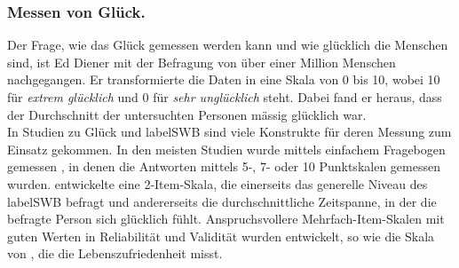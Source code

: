 \subsubsection{Messen von Glück.}
Der Frage, wie das Glück gemessen werden kann und wie glücklich die Menschen sind, ist Ed Diener \citeyear{Myers:1995} mit der Befragung von über einer Million Menschen nachgegangen. Er transformierte die Daten in eine Skala von 0 bis 10, wobei 10 für \textit{extrem glücklich} und 0 für \textit{sehr unglücklich} steht. Dabei fand er heraus, dass der Durchschnitt der untersuchten Personen mässig glücklich war.\\
In Studien zu Glück und \gls{labelSWB} sind viele Konstrukte für deren Messung zum Einsatz gekommen. In den meisten Studien wurde mittels einfachem Fragebogen gemessen \cite{Carr2011}, in denen die Antworten mittels 5-, 7- oder 10 Punktskalen gemessen wurden.  entwickelte eine 2-Item-Skala, die einerseits das generelle Niveau des \gls{labelSWB} befragt und andererseits die durchschnittliche Zeitspanne, in der die befragte Person sich glücklich fühlt. Anspruchsvollere Mehrfach-Item-Skalen mit guten Werten in Reliabilität und Validität wurden entwickelt, so wie die Skala von , die die Lebenszufriedenheit misst.

